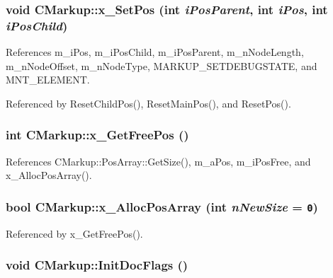 \subsubsection[x\_\-SetPos]{\setlength{\rightskip}{0pt plus 5cm}void CMarkup::x\_\-SetPos (int {\em iPosParent}, \/  int {\em iPos}, \/  int {\em iPosChild})\hspace{0.3cm}{\tt  [inline, protected]}}\label{classCMarkup_b64a1aaeaef4deab466af63b9bb82924}




References m\_\-iPos, m\_\-iPosChild, m\_\-iPosParent, m\_\-nNodeLength, m\_\-nNodeOffset, m\_\-nNodeType, MARKUP\_\-SETDEBUGSTATE, and MNT\_\-ELEMENT.

Referenced by ResetChildPos(), ResetMainPos(), and ResetPos().
\subsubsection[x\_\-GetFreePos]{\setlength{\rightskip}{0pt plus 5cm}int CMarkup::x\_\-GetFreePos ()\hspace{0.3cm}{\tt  [inline, protected]}}\label{classCMarkup_43983d1f3627432ce893f5e0898848f2}




References CMarkup::PosArray::GetSize(), m\_\-aPos, m\_\-iPosFree, and x\_\-AllocPosArray().
\subsubsection[x\_\-AllocPosArray]{\setlength{\rightskip}{0pt plus 5cm}bool CMarkup::x\_\-AllocPosArray (int {\em nNewSize} = {\tt 0})\hspace{0.3cm}{\tt  [protected]}}\label{classCMarkup_68cb62765d67e529b04134f561851342}




Referenced by x\_\-GetFreePos().
\subsubsection[InitDocFlags]{\setlength{\rightskip}{0pt plus 5cm}void CMarkup::InitDocFlags ()\hspace{0.3cm}{\tt  [inline, protected]}}\label{classCMarkup_6ce98f8685f47a0d5457ade12a9b500f}




